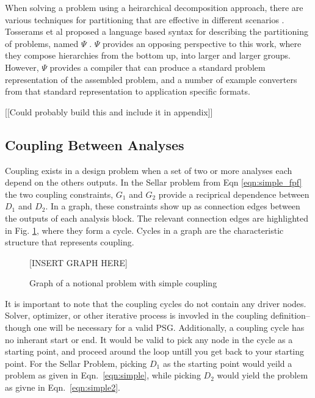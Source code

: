   When solving a problem using a heirarchical decomposition approach, 
  there are various techniques for partitioning that are effective in different 
  scenarios \cite{krishnamachari1997optimal,michelena1997hypergraph,
  sobieszczanski1997,Perez2004,allison2009optimal}. Tosserams et al proposed a 
  language based syntax for describing the partitioning of problems, named $\Psi$
  \cite{tosserams2010specification}. $\Psi$ provides an opposing perspective to 
  this work, where they compose hierarchies from the bottom up, into larger and 
  larger groups. However, $\Psi$ provides a compiler that can produce a standard 
  problem representation of the assembled problem, and a number of example converters
  from that standard representation to application specific formats. 

  [[Could probably build this and include it in appendix]] 


\subsection{Coupling Between Analyses}

  Coupling exists in a design problem when a set of two or more analyses each depend on the
  others outputs. In the Sellar problem from Eqn \ref{eqn:simple_fpf} the two 
  coupling constraints, $G_1$ and $G_2$ provide a reciprical dependence between 
  $D_1$ and $D_2$. In a graph, these constraints show up as connection edges between 
  the outputs of each analysis block. The relevant connection edges are highlighted in 
  Fig. \ref{f:coupling}, where they form a cycle. Cycles in a graph are the characteristic 
  structure that represents coupling. 

  \begin{figure}
      \begin{center}
      [INSERT GRAPH HERE]
      \caption{Graph of a notional problem with simple coupling \label{f:coupling}}
      \end{center}
  \end{figure}

	It is important to note that the coupling cycles do not contain 
	any driver nodes. Solver, optimizer, or other iterative process is 
	invovled in the coupling definition--though one will be necessary for a valid 
  PSG. Additionally, a coupling cycle has no inherant start or end. It would be
  valid to pick any node in the cycle as a starting point, and proceed around the
  loop untill you get back to your starting point. For the Sellar Problem, picking 
  $D_1$ as the starting point would yeild a problem as given in 
	Eqn.~\ref{eqn:simple}, while picking $D_2$ would yield the problem as givne in 
  Eqn.~\ref{eqn:simple2}.

